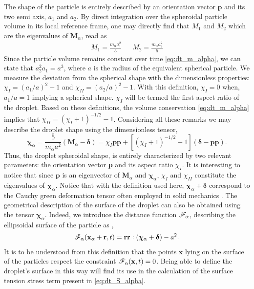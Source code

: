 The shape of the particle is entirely described by an orientation vector $\textbf{p}$ and its two semi axis, $a_1$ and $a_2$.  
By direct integration over the spheroidal particle volume in its local reference frame, one may directly find that $M_1$ and $M_2$ which are the eigenvalues of $\textbf{M}_\alpha$, read as 
\begin{align*}
    M_1 = \frac{m_\alpha a_1^2}{5}
    && M_2 = \frac{m_\alpha a_2^2}{5}
\end{align*}
Since the particle volume remains constant over time  \eqref{eq:dt_m_alpha}, we can state that $a_2^2 a_1 =a^3$, where $a$ is the radius of the equivalent spherical particle. 
We measure the deviation from the spherical shape with the dimensionless properties: $\chi_I = (a_1/a)^2 - 1$ and $\chi_{II} = (a_2/a)^2 - 1$. 
With this definition, $\chi_I = 0$ when, $a_1/a =1$ implying a spherical shape. 
$\chi_I$ will be termed the first aspect ratio of the droplet.  
Based on these definitions, the volume conservation \eqref{eq:dt_m_alpha} implies that $\chi_{II} = (\chi_I + 1)^{-1/2} - 1$.
Considering all these remarks we may describe the droplet shape using the dimensionless tensor, 
\begin{equation*}
    \bm\chi_\alpha
    = \frac{5}{m_\alpha a^2}(\textbf{M}_\alpha - \bm\delta)
    = \chi_I \textbf{pp}
        +[(\chi_I + 1)^{-1/2} - 1 ] (\bm\delta - \textbf{pp}). 
\end{equation*}
Thus, the droplet spheroidal shape, is entirely characterized by two relevant parameters: the orientation vector \textbf{p} and its aspect ratio $\chi_I$.
It is interesting to notice that since $\textbf{p}$ is an eigenvector of $\textbf{M}_\alpha$ and $\bm\chi_\alpha$, $\chi_I$ and $\chi_{II}$ constitute the eigenvalues of $\bm\chi_\alpha$. 
Notice that with the definition used here, $\bm\chi_\alpha +\bm\delta$ correspond to the Cauchy green deformation tensor often employed in solid mechanics \citep{mwasame2018macroscopic}. 
The geometrical description of the surface of the droplet can also be obtained using the tensor $\bm\chi_\alpha$. 
Indeed, we introduce the distance function  $\mathscr{F}_\alpha$, describing the ellipsoidal surface of the particle as \citep{nadim1996concise},  
\begin{equation*}
    \mathscr{F}_\alpha(\textbf{x}_\alpha +\textbf{r},t) = \textbf{rr}:(\bm\chi_\alpha +\bm\delta)-a^2.  
    \label{eq:distance_function}
\end{equation*}
It is to be understood from this definition that the points $\textbf{x}$ lying on the surface of the particles respect the constraint $\mathscr{F}_\alpha(\textbf{x},t) = 0$. 
Being able to define the droplet's surface in this way will find its use in the calculation of the surface tension stress term present in \ref{eq:dt_S_alpha}. 

